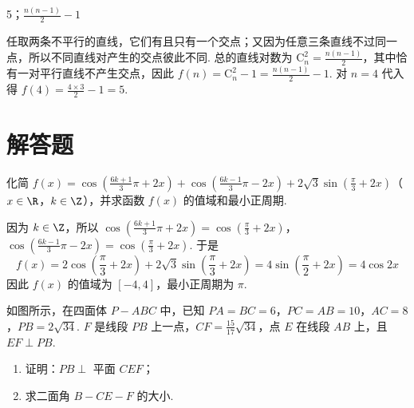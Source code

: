 \begin{answer}
5；\(\frac{n(n-1)}{2}-1\)
\end{answer}

\begin{solution}
任取两条不平行的直线，它们有且只有一个交点；又因为任意三条直线不过同一点，所以不同直线对产生的交点彼此不同. 总的直线对数为 \(\mathrm C_n^2=\frac{n(n-1)}{2}\)，其中恰有一对平行直线不产生交点，因此 \(f(n)=\mathrm C_n^2-1=\frac{n(n-1)}{2}-1\). 对 \(n=4\) 代入得 \(f(4)=\frac{4\times3}{2}-1=5\).
\end{solution}

\section{解答题}
\begin{problem}
化简 \(f(x) = \cos\left( \frac{6k + 1}{3} \pi + 2x \right) + \cos\left( \frac{6k - 1}{3} \pi - 2x \right) + 2\sqrt{3} \sin\left( \frac{\pi}{3} + 2x \right)\)（\(x \in \R\)，\(k \in \Z\)），并求函数 \(f(x)\) 的值域和最小正周期.
\end{problem}

\begin{solution}
因为 \(k \in \Z\)，所以
\(\cos\left(\frac{6k+1}{3}\pi+2x\right)=\cos\left(\frac{\pi}{3}+2x\right)\)，
\(\cos\left(\frac{6k-1}{3}\pi-2x\right)=\cos\left(\frac{\pi}{3}+2x\right)\).
于是
\[
f(x)=2\cos\left(\frac{\pi}{3}+2x\right)+2\sqrt{3}\sin\left(\frac{\pi}{3}+2x\right)
=4\sin\left(\frac{\pi}{2}+2x\right)=4\cos 2x
\]
因此 \(f(x)\) 的值域为 \([-4,4]\)，最小正周期为 \(\pi\).
\end{solution}

\begin{problem}
如图所示，在四面体 \(P-ABC\) 中，已知 \(PA = BC = 6\)，\(PC = AB = 10\)，\(AC = 8\)，\(PB = 2\sqrt{34}\). \(F\) 是线段 \(PB\) 上一点，\(CF = \frac{15}{17}\sqrt{34}\)，点 \(E\) 在线段 \(AB\) 上，且 \(EF \perp PB\).

\begin{enumerate}
\item 证明：\(PB \perp\) 平面 \(CEF\)；
\item 求二面角 \(B-CE-F\) 的大小.
\end{enumerate}

\end{problem}

